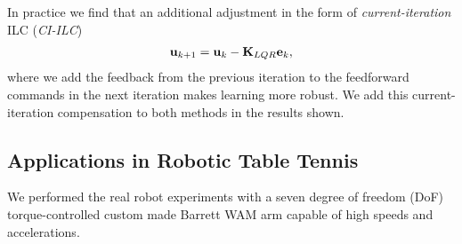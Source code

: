 In practice we find that an additional adjustment in the form of \emph{current-iteration} ILC (\emph{CI-ILC}) 
%
\begin{equation}
\begin{aligned}
\boldsymbol{\mathrm{u}}_{k+1} &= \boldsymbol{\mathrm{u}}_k - \boldsymbol{\mathrm{K}}_{LQR}\boldsymbol{\mathrm{e}}_{k},\\
\end{aligned}
\label{fbILC}
\end{equation}
%
\noindent where we add the feedback from the previous iteration to the feedforward commands in the next iteration makes learning more robust. We add this current-iteration compensation to both methods in the results shown. 


\subsection{Applications in Robotic Table Tennis}

We performed the real robot experiments with a seven degree of freedom (DoF) torque-controlled custom made Barrett WAM arm capable of high speeds and accelerations.